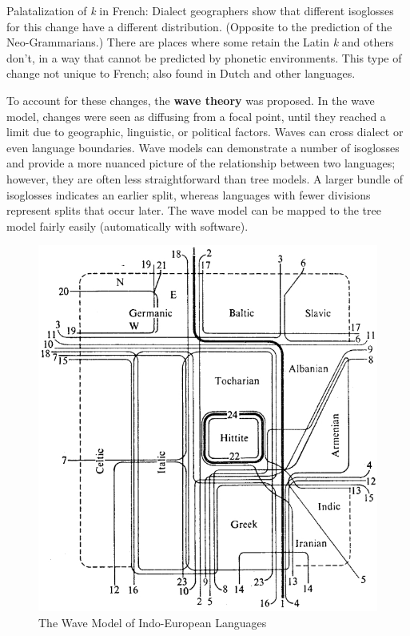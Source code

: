 \documentclass{exam}
\begin{document}
Palatalization of \textit{k} in French: Dialect geographers show that different isoglosses for this change have a different distribution. (Opposite to the prediction of the Neo-Grammarians.) There are places where some retain the Latin \textit{k} and others don't, in a way that cannot be predicted by phonetic environments. This type of change not unique to French; also found in Dutch and other languages. 

To account for these changes, the \textbf{wave theory }was proposed. In the wave model, changes were seen as diffusing from a focal point, until they reached a limit due to geographic, linguistic, or political factors. Waves can cross dialect or even language boundaries. Wave models can demonstrate a number of isoglosses and provide a more nuanced picture of the relationship between two languages; however, they are often less straightforward than tree models. A larger bundle of isoglosses indicates an earlier split, whereas languages with fewer divisions represent splits that occur later. The wave model can be mapped to the tree model fairly easily (automatically with software). 

\begin{figure}[h!]
\centering
\includegraphics[scale=.6]{images/Indo.jpg}
\caption{The Wave Model of Indo-European Languages}
\label{fig:download}
\end{figure}
\end{document}
